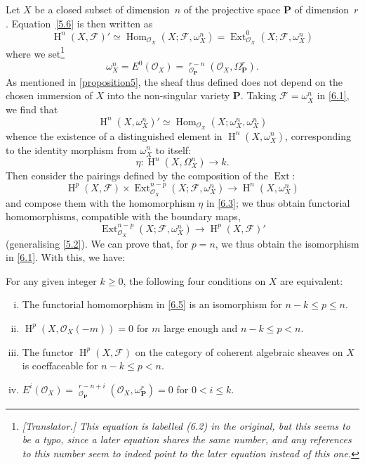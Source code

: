 \documentclass{article}
\theoremstyle{plain}
\newenvironment{theorem}[1]
  {\renewcommand\theinnercustomtheorem{#1}\innercustomtheorem}
  {\endinnercustomtheorem}
\theoremstyle{definition}
\newcommand{\sh}[1]{{\mathscr{#1}}}
\newcommand{\bb}{\mathbf}
\renewcommand{\geq}{\geqslant}
\renewcommand{\leq}{\leqslant}
\DeclareMathOperator{\Ext}{Ext}
\DeclareMathOperator{\Hom}{Hom}
\DeclareMathOperator{\shExt}{\underline{Ext}}
\DeclareMathOperator{\HH}{H}
\newcommand{\oldpage}[1]{\marginpar{\footnotesize$\Big\vert$ \textit{p.~#1}}}
\begin{document}
Let $X$ be a closed subset of dimension~$n$ of the projective space $\bb{P}$ of dimension~$r$.
Equation~\cref{5.6} is then written as
\[
\label{6.1}
  \HH^n(X,\sh{F})'
  \simeq \Hom_{\sh{O}_X}(X;\sh{F},\omega_X^n)
  = \Ext_{\sh{O}_X}^0(X;\sh{F},\omega_X^n)
\tag{6.1}
\]
where we set\footnote{\emph{[Translator.] This equation is labelled (6.2) in the original, but this seems to be a typo, since a later equation shares the same number, and any references to this number seem to indeed point to the later equation instead of this one.}}
\[
  \omega_X^n = E^0(\sh{O}_X) = \shExt_{\sh{O}_\bb{P}}^{r-n}(\sh{O}_X,\Omega_\bb{P}^r).
\]
As mentioned in \cref{proposition5}, the sheaf thus defined does not depend on the chosen immersion of $X$ into the non-singular variety $\bb{P}$.
Taking $\sh{F}=\omega_X^n$ in \cref{6.1}, we find that
\[
\label{6.2}
  \HH^n(X,\omega_X^n)' \simeq \Hom_{\sh{O}_X}(X;\omega_X^n,\omega_X^n)
\tag{6.2}
\]
whence the existence of a distinguished element in $\HH^n(X,\omega_X^n)$, corresponding to the identity morphism from $\omega_X^n$ to itself:
\[
\label{6.3}
  \eta\colon \HH^n(X,\Omega_X^n) \to k.
\tag{6.3}
\]
\oldpage{149-18}
Then consider the pairings defined by the composition of the $\Ext$:
\[
\label{6.4}
  \HH^p(X,\sh{F}) \times \Ext_{\sh{O}_X}^{n-p}(X;\sh{F},\omega_X^n)
  \to \HH^n(X,\omega_X^n)
\tag{6.4}
\]
and compose them with the homomorphism $\eta$ in \cref{6.3}; we thus obtain functorial homomorphisms, compatible with the boundary maps,
\[
\label{6.5}
  \Ext_{\sh{O}_X}^{n-p}(X;\sh{F},\omega_X^n) \to \HH^p(X,\sh{F})'
\tag{6.5}
\]
(generalising \cref{5.2}).
We can prove that, for $p=n$, we thus obtain the isomorphism in \cref{6.1}.
With this, we have:

\begin{theorem}{3~bis}
\label{theorem3bis}
  For any given integer $k\geq0$, the following four conditions on $X$ are equivalent:
  \begin{enumerate}[i.]
    \item The functorial homomorphism in \cref{6.5} is an isomorphism for $n-k\leq p\leq n$.
    \item $\HH^p(X,\sh{O}_X(-m)) = 0$ for $m$ large enough and $n-k\leq p<n$.
    \item The functor $\HH^p(X,\sh{F})$ on the category of coherent algebraic sheaves on $X$ is coeffaceable for $n-k\leq p<n$.
    \item $E^i(\sh{O}_X) = \shExt_{\sh{O}_\bb{P}}^{r-n+i}(\sh{O}_X,\omega_\bb{P}^r) = 0$ for $0<i\leq k$.
  \end{enumerate}
\end{theorem}
\end{document}
